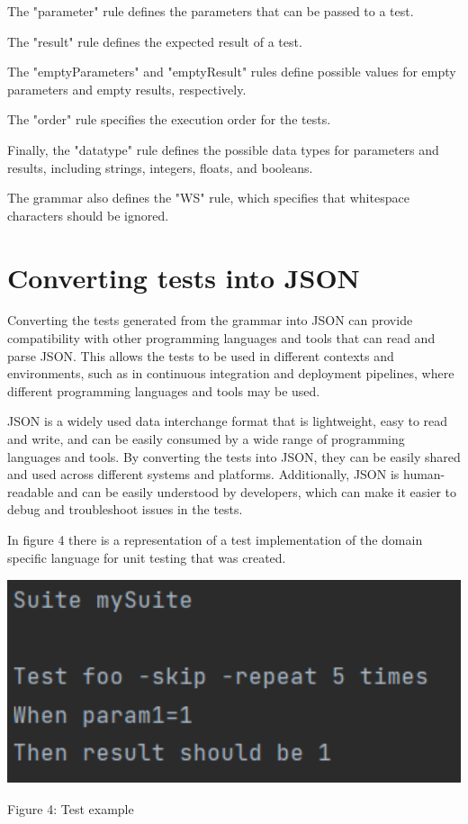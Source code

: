 The "parameter" rule defines the parameters that can be passed to a test.

The "result" rule defines the expected result of a test.

The "emptyParameters" and "emptyResult" rules define possible values for empty parameters and empty results, respectively.

The "order" rule specifies the execution order for the tests.

Finally, the "datatype" rule defines the possible data types for parameters and results, including strings, integers, floats, and booleans.

The grammar also defines the "WS" rule, which specifies that whitespace characters should be ignored.


\section{Converting tests into JSON}

Converting the tests generated from the grammar into JSON can provide compatibility with other programming languages and tools that can read and parse JSON. This allows the tests to be used in different contexts and environments, such as in continuous integration and deployment pipelines, where different programming languages and tools may be used.

JSON is a widely used data interchange format that is lightweight, easy to read and write, and can be easily consumed by a wide range of programming languages and tools. By converting the tests into JSON, they can be easily shared and used across different systems and platforms. Additionally, JSON is human-readable and can be easily understood by developers, which can make it easier to debug and troubleshoot issues in the tests.

In figure 4 there is a representation of a test implementation of the domain specific language for unit testing that was created.

{ \centering \includegraphics[width=\textwidth , height=6cm]{images/test1.png} }
\begin{center} Figure 4: Test example \end{center}

